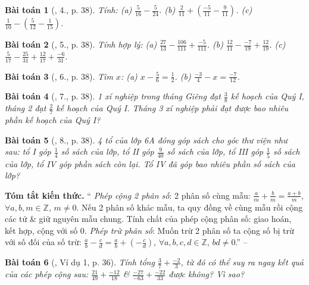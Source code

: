 \documentclass{article}
\newtheorem{baitoan}{Bài toán}
\begin{document}
\begin{baitoan}[\cite{SGK_Toan_6_Canh_Dieu_tap_2}, 4., p. 38]
	Tính: (a) $\frac{5}{16} - \frac{5}{24}$. (b) $\frac{2}{11} + \left(\frac{-5}{11} - \frac{9}{11}\right)$. (c) $\frac{1}{10} - \left(\frac{5}{12} - \frac{1}{15}\right)$.
\end{baitoan}

\begin{baitoan}[\cite{SGK_Toan_6_Canh_Dieu_tap_2}, 5., p. 38]
	Tính hợp lý: (a) $\frac{27}{13} - \frac{106}{111} + \frac{-5}{111}$. (b) $\frac{12}{11} - \frac{-7}{19} + \frac{12}{19}$. (c) $\frac{5}{17} - \frac{25}{31} + \frac{12}{17} + \frac{-6}{31}$.
\end{baitoan}

\begin{baitoan}[\cite{SGK_Toan_6_Canh_Dieu_tap_2}, 6., p. 38]
	Tìm $x$: (a) $x - \frac{5}{6} = \frac{1}{2}$. (b) $\frac{-3}{4} - x = \frac{-7}{12}$.
\end{baitoan}

\begin{baitoan}[\cite{SGK_Toan_6_Canh_Dieu_tap_2}, 7., p. 38]
	1 xí nghiệp trong tháng Giêng đạt $\frac{3}{8}$ kế hoạch của Quý I, tháng 2 đạt $\frac{2}{7}$ kế hoạch của Quý I. Tháng 3 xí nghiệp phải đạt được bao nhiêu phần kế hoạch của Quý I?
\end{baitoan}

\begin{baitoan}[\cite{SGK_Toan_6_Canh_Dieu_tap_2}, 8., p. 38]
	4 tổ của lớp 6A đóng góp sách cho góc thư viện như sau: tổ I góp $\frac{1}{4}$ số sách của lớp, tổ II góp $\frac{9}{40}$ số sách của lớp, tổ III góp $\frac{1}{5}$ số sách của lớp, tổ IV góp phần sách còn lại. Tổ IV đã góp bao nhiêu phần số sách của lớp?
\end{baitoan}
\noindent\textsf{\textbf{Tóm tắt kiến thức.}} `` \textit{Phép cộng 2 phân số}: 2 phân số cùng mẫu: $\frac{a}{m} + \frac{b}{m} = \frac{a + b}{m}$, $\forall a,b,m\in\mathbb{Z}$, $m\ne0$. Nếu 2 phân số khác mẫu, ta quy đồng về cùng mẫu rồi cộng các tử \& giữ nguyên mẫu chung. Tính chất của phép cộng phân số: giao hoán, kết hợp, cộng với số $0$.  \textit{Phép trừ phân số}: Muốn trừ 2 phân số ta cộng số bị trừ với số đối của số trừ: $\frac{a}{b} - \frac{c}{d} = \frac{a}{b} + \left(-\frac{c}{d}\right)$, $\forall a,b,c,d\in\mathbb{Z}$, $bd\ne0$.'' -- \cite[Chap. V, \S3, p. 36]{SBT_Toan_6_Canh_Dieu_tap_2}

\begin{baitoan}[\cite{SBT_Toan_6_Canh_Dieu_tap_2}, Ví dụ 1, p. 36]
	Tính tổng $\frac{3}{7} + \frac{-2}{3}$, từ đó có thể suy ra ngay kết quả của các phép cộng sau: $\frac{21}{49} + \frac{-12}{18}$ \& $\frac{-27}{-63} + \frac{-22}{33}$ được không? Vì sao?
\end{baitoan}
\end{document}
